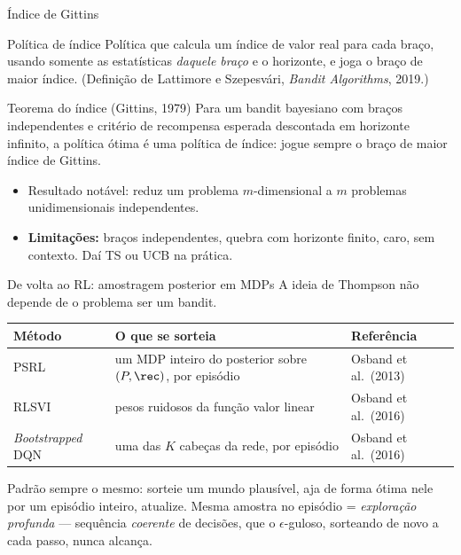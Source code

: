 \documentclass[aspectratio=169, 11pt]{beamer}
\begin{document}
\begin{frame}{Índice de Gittins}
  \begin{defbox}{Política de índice}
    Política que calcula um índice de valor real para cada braço, usando
    somente as estatísticas \emph{daquele braço} e o horizonte, e joga o
    braço de maior índice.
    {\scriptsize (Definição de Lattimore e Szepesvári, \emph{Bandit
    Algorithms}, 2019.)}
  \end{defbox}

  \begin{teobox}{Teorema do índice (Gittins, 1979)}
    Para um bandit bayesiano com braços \alert{independentes} e critério de
    recompensa esperada \alert{descontada} em horizonte infinito, a
    política ótima é uma política de índice: jogue sempre o braço de maior
    índice de Gittins.
  \end{teobox}

  \vspace{-0.5em}
  \begin{itemize}
    \item Resultado notável: reduz um problema $m$-dimensional a $m$
          problemas unidimensionais independentes.
    \item \textbf{Limitações:} braços independentes, quebra com horizonte
          finito, caro, sem contexto. Daí TS ou UCB na prática.
  \end{itemize}
\end{frame}

\begin{frame}{De volta ao RL: amostragem posterior em MDPs}
  A ideia de Thompson não depende de o problema ser um bandit.

  \smallskip
  \begin{center}\scriptsize
  \begin{tabular}{@{}lp{5.4cm}l@{}}
    \toprule
    \textbf{Método} & \textbf{O que se sorteia} & \textbf{Referência} \\
    \midrule
    PSRL & um MDP inteiro do posterior sobre $(P, \rec)$, por episódio
         & Osband et al.\ (2013) \\
    RLSVI & pesos ruidosos da função valor linear & Osband et al.\ (2016) \\
    \emph{Bootstrapped} DQN & uma das $K$ cabeças da rede, por episódio
         & Osband et al.\ (2016) \\
    \bottomrule
  \end{tabular}
  \end{center}

  \medskip
  \begin{ideiabox}
    Padrão sempre o mesmo: \alert{sorteie um mundo plausível, aja de forma
    ótima nele por um episódio inteiro, atualize}. Mesma amostra no
    episódio = \emph{exploração profunda} — sequência \emph{coerente} de
    decisões, que o $\epsilon$-guloso, sorteando de novo a cada passo,
    nunca alcança.
  \end{ideiabox}
\end{frame}
\end{document}
